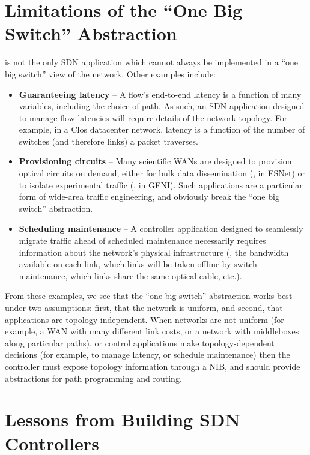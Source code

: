 \section{Limitations of the ``One Big Switch'' Abstraction}
\label{sec:one-big-switch}

\sys is not the only SDN application which cannot always be implemented in a ``one big switch''
view of the network. Other examples include:

\begin{itemize}
\item {\bf Guaranteeing latency} -- A flow's end-to-end latency is a function of
many variables, including the choice of path. As such, an SDN application designed to manage flow
latencies will require details of the network topology. For example, in a Clos datacenter network,
latency is a function of the number of switches (and therefore links) a packet traverses.

\item {\bf Provisioning circuits} -- Many scientific WANs are designed to provision optical circuits
on demand, either for bulk data dissemination (\eg, in ESNet) or to isolate experimental traffic
(\eg, in GENI). Such applications are a particular form of wide-area traffic engineering, and
obviously break the ``one big switch'' abstraction.

\item {\bf Scheduling maintenance} -- A controller application designed to seamlessly migrate
traffic ahead of scheduled maintenance necessarily requires information about the network's
physical infrastructure (\eg, the bandwidth available on each link, which links will be taken
offline by switch maintenance, which links share the same optical cable, etc.).
\end{itemize}

From these examples, we see that the ``one big switch'' abstraction works best under two
assumptions: first, that the network is uniform, and second, that applications are topology-independent.
When networks are not uniform (for example, a WAN with many different link costs,
or a network with middleboxes along particular paths), or control applications
make topology-dependent decisions (for example, to manage latency, or schedule maintenance) then
the controller must expose topology information through a NIB, and should provide abstractions for path
programming and routing.

\section{Lessons from Building SDN Controllers}
\label{sec:building-controllers}

